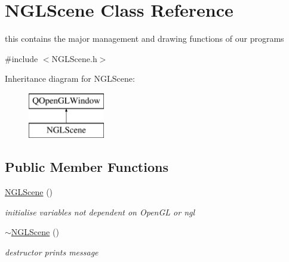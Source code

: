 \hypertarget{class_n_g_l_scene}{\section{N\-G\-L\-Scene Class Reference}
\label{class_n_g_l_scene}
}


this contains the major management and drawing functions of our programs  




{\ttfamily \#include $<$N\-G\-L\-Scene.\-h$>$}

Inheritance diagram for N\-G\-L\-Scene\-:\begin{figure}[H]
\begin{center}
\leavevmode
\includegraphics[height=2.000000cm]{class_n_g_l_scene}
\end{center}
\end{figure}
\subsection*{Public Member Functions}
\begin{DoxyCompactItemize}
\item 
\hypertarget{class_n_g_l_scene_a1bed6be9823459aeb1e58af2464ba633}{\hyperlink{class_n_g_l_scene_a1bed6be9823459aeb1e58af2464ba633}{N\-G\-L\-Scene} ()}\label{class_n_g_l_scene_a1bed6be9823459aeb1e58af2464ba633}

\begin{DoxyCompactList}\small\item\em initialise variables not dependent on Open\-G\-L or ngl \end{DoxyCompactList}\item 
\hypertarget{class_n_g_l_scene_abda05d130945833bfbb6bad8d619f7f5}{\hyperlink{class_n_g_l_scene_abda05d130945833bfbb6bad8d619f7f5}{$\sim$\-N\-G\-L\-Scene} ()}\label{class_n_g_l_scene_abda05d130945833bfbb6bad8d619f7f5}

\begin{DoxyCompactList}\small\item\em destructor prints message \end{DoxyCompactList}\end{DoxyCompactItemize}
